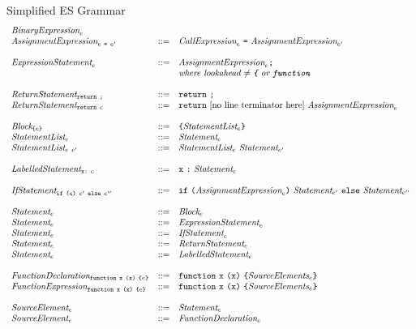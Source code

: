 \documentclass[preprint,10pt]{sigplanconf}
\begin{document}
\begin{displayfigure*}{\label{fig:grammar}Simplified ES Grammar}
\[\begin{array}{lcl}
  \textit{BinaryExpression}_{e}
  \\
  \textit{AssignmentExpression}_{e~\texttt{=}~e'} &::=&
  \textit{CallExpression}_{e}~\texttt{=}~
  \textit{AssignmentExpression}_{e'}
  \\ \\
  \textit{ExpressionStatement}_{e} &::=&
  \textit{AssignmentExpression}_{e} \texttt{;}
  \\ 
  &&  \textit{where lookahead \( \not =
    \texttt{\{} \) or \( \texttt{function} \)}
  \\ \\
  \textit{ReturnStatement}_{\texttt{return}~\texttt{;}} &::=&
  \texttt{return}~\texttt{;}
  \\
  \textit{ReturnStatement}_{\texttt{return}~e} &::=&
  \texttt{return}~\textrm{[no line terminator here]}~\textit{AssignmentExpression}_{e}
  \\ \\
  \textit{Block}_{\texttt{\{}e\texttt{\}}} &::=&
  \texttt{\{} \textit{StatementList}_{e} \texttt{\}} 
  \\
  \textit{StatementList}_{e} &::=&
  \textit{Statement}_{e}
  \\
  \textit{StatementList}_{e~e'} &::=&
  \textit{StatementList}_{e}~
  \textit{Statement}_{e'}
  \\ \\
  \textit{LabelledStatement}_{\texttt{x}\texttt{:}~e} &::=&
  \texttt{x}~\texttt{:}~\textit{Statement}_{e}
  \\ \\
  \textit{IfStatement}_{\texttt{if}~\texttt{(}e\texttt{)}~e'~\texttt{else}~e''} &::=&
  \texttt{if}~\texttt{(}\textit{AssignmentExpression}_{e}\texttt{)}~\textit{Statement}_{e'}~
  \texttt{else}~\textit{Statement}_{e''}
  \\ \\
  \textit{Statement}_{e} &::=& \textit{Block}_{e}
  \\
  \textit{Statement}_{e} &::=& \textit{ExpressionStatement}_{e}
  \\
  \textit{Statement}_{e} &::=& \textit{IfStatement}_{e}
  \\
  \textit{Statement}_{e} &::=& \textit{ReturnStatement}_{e}
  \\
  \textit{Statement}_{e} &::=& \textit{LabelledStatement}_{e}
  \\ \\
  \textit{FunctionDeclaration}_{\texttt{function}~\texttt{x}~\texttt{(}\texttt{x}\texttt{)}~\texttt{\{}e\texttt{\}}} 
  &::=&
  \texttt{function}~\texttt{x}~\texttt{(}\texttt{x}\texttt{)}~
  \texttt{\{}\textit{SourceElements}_{e}\texttt{\}}
  \\
  \textit{FunctionExpression}_{\texttt{function}~\texttt{x}~\texttt{(}\texttt{x}\texttt{)}~\texttt{\{}e\texttt{\}}} 
  &::=&
  \texttt{function}~\texttt{x}~\texttt{(}\texttt{x}\texttt{)}~
  \texttt{\{}\textit{SourceElements}_{e}\texttt{\}}
  \\ \\
  \textit{SourceElement}_{e} &::=& \textit{Statement}_{e} 
  \\
  \textit{SourceElement}_{e} &::=& \textit{FunctionDeclaration}_{e}
  \\ \\


\end{array}\]
\end{displayfigure*}
\end{document}
